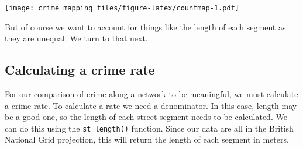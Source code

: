 \documentclass[
  krantz2]{krantz}
\makeatletter
\newenvironment{Shaded}{\begin{snugshade}}{\end{snugshade}}
\newcommand{\AttributeTok}[1]{\textcolor[rgb]{0.61,0.61,0.61}{#1}}
\newcommand{\CommentTok}[1]{\textcolor[rgb]{0.37,0.37,0.37}{\textit{#1}}}
\newcommand{\DecValTok}[1]{\textcolor[rgb]{0.06,0.06,0.06}{#1}}
\newcommand{\FunctionTok}[1]{\textcolor[rgb]{0,0,0}{#1}}
\newcommand{\NormalTok}[1]{#1}
\newcommand{\OtherTok}[1]{\textcolor[rgb]{0.37,0.37,0.37}{#1}}
\newcommand{\SpecialCharTok}[1]{\textcolor[rgb]{0,0,0}{#1}}
\newcommand{\StringTok}[1]{\textcolor[rgb]{0.5,0.5,0.5}{#1}}
\newenvironment{kframe}{%
\medskip{}
\setlength{\fboxsep}{.8em}
 \def\at@end@of@kframe{}%
 \ifinner\ifhmode%
  \def\at@end@of@kframe{\end{minipage}}%
  \begin{minipage}{\columnwidth}%
 \fi\fi%
 \def\FrameCommand##1{\hskip\@totalleftmargin \hskip-\fboxsep
 \colorbox{shadecolor}{##1}\hskip-\fboxsep
     \hskip-\linewidth \hskip-\@totalleftmargin \hskip\columnwidth}%
 \MakeFramed {\advance\hsize-\width
   \@totalleftmargin\z@ \linewidth\hsize
   \@setminipage}}%
 {\par\unskip\endMakeFramed%
 \at@end@of@kframe}
\renewenvironment{Shaded}{\begin{kframe}}{\end{kframe}}
\makeatother
\begin{document}
\begin{Shaded}
\end{Shaded}

\texttt{[image: crime\_mapping\_files/figure-latex/countmap-1.pdf]}

But of course we want to account for things like the length of each segment as they are unequal. We turn to that next.

\hypertarget{calculating-a-crime-rate}{%
\subsection{Calculating a crime rate}\label{calculating-a-crime-rate}}

For our comparison of crime along a network to be meaningful, we must calculate a crime rate. To calculate a rate we need a denominator. In this case, length may be a good one, so the length of each street segment needs to be calculated. We can do this using the \texttt{st\_length()} function. Since our data are all in the British National Grid projection, this will return the length of each segment in meters.

\begin{Shaded}
\end{Shaded}
\end{document}
